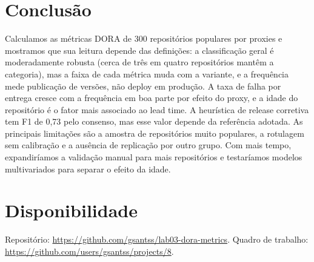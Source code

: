 \documentclass[12pt]{article}
\begin{document}
\section{Conclusão}
\label{sec:conclusao}

Calculamos as métricas DORA de 300 repositórios populares por proxies e mostramos que sua leitura depende das definições: a classificação geral é moderadamente robusta (cerca de três em quatro repositórios mantêm a categoria), mas a faixa de cada métrica muda com a variante, e a frequência mede publicação de versões, não deploy em produção. A taxa de falha por entrega cresce com a frequência em boa parte por efeito do proxy, e a idade do repositório é o fator mais associado ao lead time. A heurística de release corretiva tem F1 de 0,73 pelo consenso, mas esse valor depende da referência adotada. As principais limitações são a amostra de repositórios muito populares, a rotulagem sem calibração e a ausência de replicação por outro grupo. Com mais tempo, expandiríamos a validação manual para mais repositórios e testaríamos modelos multivariados para separar o efeito da idade.

\section*{Disponibilidade}
Repositório: \url{https://github.com/gsantss/lab03-dora-metrics}. Quadro de trabalho: \url{https://github.com/users/gsantss/projects/8}.



\end{document}
